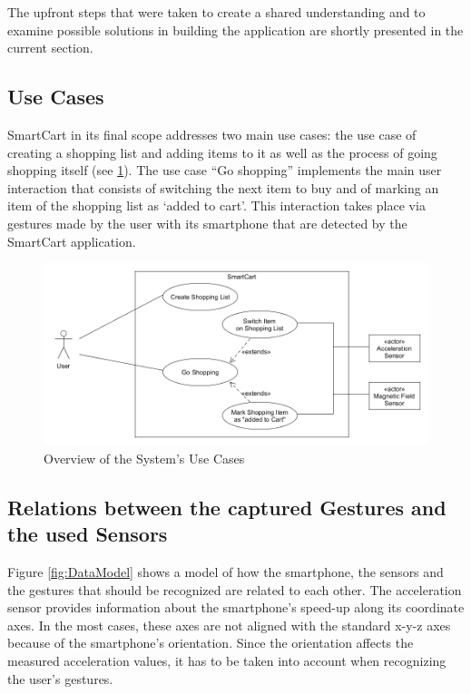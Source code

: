 The upfront steps that were taken to create a shared understanding and to
examine possible solutions in building the application are shortly presented in
the current section.

\subsection{Use Cases}
SmartCart in its final scope addresses two main use cases: the use case of
creating a shopping list and adding items to it as well as the process of going
shopping itself (see \ref{fig:UseCases}). The use case ``Go shopping''
implements the main user interaction that consists of switching the next item to
buy and of marking an item of the shopping list as `added to cart'. This
interaction takes place via gestures made by the user with its smartphone that
are detected by the SmartCart application.

\begin{figure}
\centering
\captionsetup{justification=centering}
\includegraphics[width=\textwidth]{res/sa/useCaseDiagram.png}
\caption{Overview of the System's Use Cases}
\label{fig:UseCases}
\end{figure}

\subsection{Relations between the captured Gestures
and the used Sensors}

\label{sect:dataModel}
Figure \ref{fig:DataModel} shows a model of how the smartphone, the sensors and
the gestures that should be recognized are related to each other. The
acceleration sensor provides information about the smartphone's speed-up along
its coordinate axes. In the most cases, these axes are not aligned with the
standard x-y-z axes because of the smartphone's orientation. Since the
orientation affects the measured acceleration values, it has to be taken into
account when recognizing the user's gestures.

